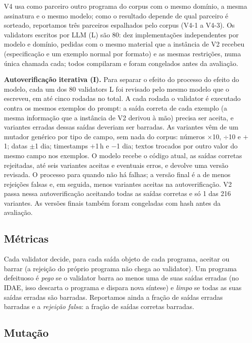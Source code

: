 \documentclass[sigconf,nonacm]{acmart}
\begin{document}
V4 usa como parceiro outro programa do corpus com o mesmo domínio, a mesma assinatura e o mesmo modelo; como o resultado depende de qual parceiro é sorteado, reportamos três parceiros espalhados pelo corpus (V4-1 a V4-3). Os validators escritos por LLM (L) são 80: dez implementações independentes por modelo e domínio, pedidas com o mesmo material que a instância de V2 recebeu (especificação e um exemplo normal por formato) e as mesmas restrições, numa única chamada cada; todos compilaram e foram congelados antes da avaliação.

\textbf{Autoverificação iterativa (I).} Para separar o efeito do processo do efeito do modelo, cada um dos 80 validators L foi revisado pelo mesmo modelo que o escreveu, em até cinco rodadas no total. A cada rodada o validator é executado contra os mesmos exemplos do prompt: a saída correta de cada exemplo (a mesma informação que a instância de V2 derivou à mão) precisa ser aceita, e variantes erradas dessas saídas deveriam ser barradas. As variantes vêm de um mutador genérico por tipo de campo, sem nada do corpus: números $\times$10, $\div$10 e $+$1; datas $\pm$1 dia; timestamps $+$1\,h e $-$1 dia; textos trocados por outro valor do mesmo campo nos exemplos. O modelo recebe o código atual, as saídas corretas rejeitadas, até seis variantes aceitas e eventuais erros, e devolve uma versão revisada. O processo para quando não há falhas; a versão final é a de menos rejeições falsas e, em seguida, menos variantes aceitas na autoverificação. V2 passa nessa autoverificação aceitando todas as saídas corretas e só 1 das 216 variantes. As versões finais também foram congeladas com hash antes da avaliação.

\subsection{Métricas}

Cada validator decide, para cada saída objeto de cada programa, aceitar ou barrar (a rejeição do próprio programa não chega ao validator). Um programa defeituoso é \textit{pego} se o validator barra ao menos uma de suas saídas erradas (no IDAE, isso descarta o programa e dispara nova síntese) e \textit{limpo} se todas as suas saídas erradas são barradas. Reportamos ainda a fração de saídas erradas barradas e a \textit{rejeição falsa}: a fração de saídas corretas barradas.

\subsection{Mutação}
\end{document}
